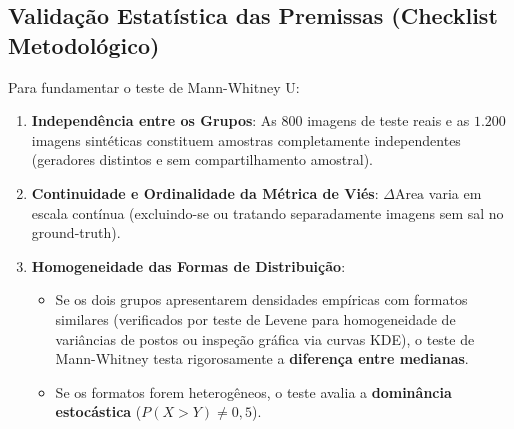 \documentclass[11pt,a4paper]{article}
\begin{document}
\subsection{Validação Estatística das Premissas (Checklist Metodológico)}
Para fundamentar o teste de Mann-Whitney U:
\begin{enumerate}
    \item \textbf{Independência entre os Grupos}: As $800$ imagens de teste reais e as $1.200$ imagens sintéticas constituem amostras completamente independentes (geradores distintos e sem compartilhamento amostral).
    \item \textbf{Continuidade e Ordinalidade da Métrica de Viés}: $\Delta\text{Area}$ varia em escala contínua (excluindo-se ou tratando separadamente imagens sem sal no ground-truth).
    \item \textbf{Homogeneidade das Formas de Distribuição}:
    \begin{itemize}
        \item Se os dois grupos apresentarem densidades empíricas com formatos similares (verificados por teste de Levene para homogeneidade de variâncias de postos ou inspeção gráfica via curvas KDE), o teste de Mann-Whitney testa rigorosamente a \textbf{diferença entre medianas}.
        \item Se os formatos forem heterogêneos, o teste avalia a \textbf{dominância estocástica} ($P(X > Y) \neq 0{,}5$).
    \end{itemize}
\end{enumerate}
\end{document}
